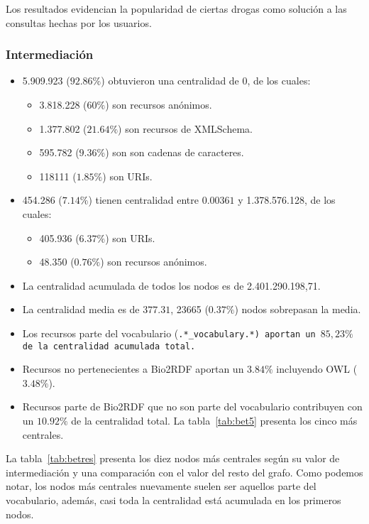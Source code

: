 Los resultados evidencian la popularidad de ciertas drogas como solución a las
consultas hechas por los usuarios. 

\subsubsection{Intermediación}
\begin{itemize}
  \item 5.909.923 ($92.86\%$) obtuvieron una centralidad de 0, de los cuales:
    \begin{itemize}
      \item 3.818.228 ($60\%$) son recursos anónimos.
      \item 1.377.802 ($21.64\%$) son recursos de XMLSchema.
      \item 595.782 ($9.36\%$) son son cadenas de caracteres.
      \item 118111 ($1.85\%$) son URIs.
    \end{itemize}
  \item
    454.286 ($7.14\%$) tienen centralidad entre $0.00361$ y 1.378.576.128, de
    los cuales:
    \begin{itemize}
      \item 405.936 ($6.37\%$) son URIs.
      \item 48.350 ($0.76\%$) son recursos anónimos.
    \end{itemize}
  \item La centralidad acumulada de todos los nodos es de 2.401.290.198,71.
  \item
    La centralidad media es de $377.31$, 23665 ($0.37\%$) nodos sobrepasan
    la media.
  \item 
    Los recursos parte del vocabulario (\tt{.*\_vocabulary.*}) aportan un 
    $85,23\%$ de la centralidad acumulada total.
  \item
    Recursos no pertenecientes a Bio2RDF aportan un $3.84\%$ incluyendo OWL 
    ($3.48\%$).
  \item 
    Recursos parte de Bio2RDF que no son parte del vocabulario contribuyen con
    un $10.92\%$ de la centralidad total. La tabla~\ref{tab:bet5} presenta los
    cinco más centrales.
\end{itemize}

La tabla~\ref{tab:betres} presenta los diez nodos más centrales según su valor
de intermediación y una comparación con el valor del resto del grafo.
Como podemos notar, los nodos más centrales nuevamente suelen ser aquellos parte
del vocabulario, además, casi toda la centralidad está acumulada en los primeros
nodos.

